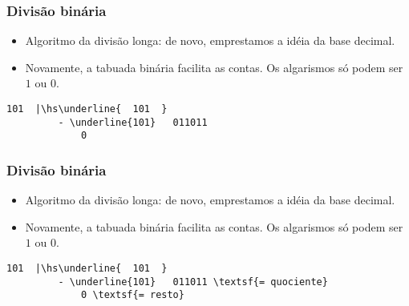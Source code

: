 \documentclass{beamer}
\begin{document}
\begin{frame}[fragile]
\frametitle{Divisão binária}

\begin{itemize}
\item Algoritmo da divisão longa: de novo, emprestamos a idéia da base decimal.

\item Novamente, a tabuada binária facilita as contas. Os algarismos só podem ser $1$ ou $0$.
\end{itemize}

\def\hs{\hspace{-1mm}}

\begin{Verbatim}[commandchars=\\\{\},codes={\catcode`$=3\catcode`^=7}]
           101  |\hs\underline{  101  }
         - \underline{101}   011011
             0
\end{Verbatim}

\end{frame}


\begin{frame}[fragile]
\frametitle{Divisão binária}

\begin{itemize}
\item Algoritmo da divisão longa: de novo, emprestamos a idéia da base decimal.

\item Novamente, a tabuada binária facilita as contas. Os algarismos só podem ser $1$ ou $0$.
\end{itemize}

\def\hs{\hspace{-1mm}}

\begin{Verbatim}[commandchars=\\\{\},codes={\catcode`$=3\catcode`^=7}]
           101  |\hs\underline{  101  }
         - \underline{101}   011011 \textsf{= quociente}
             0 \textsf{= resto}
\end{Verbatim}

\end{frame}


\end{document}
